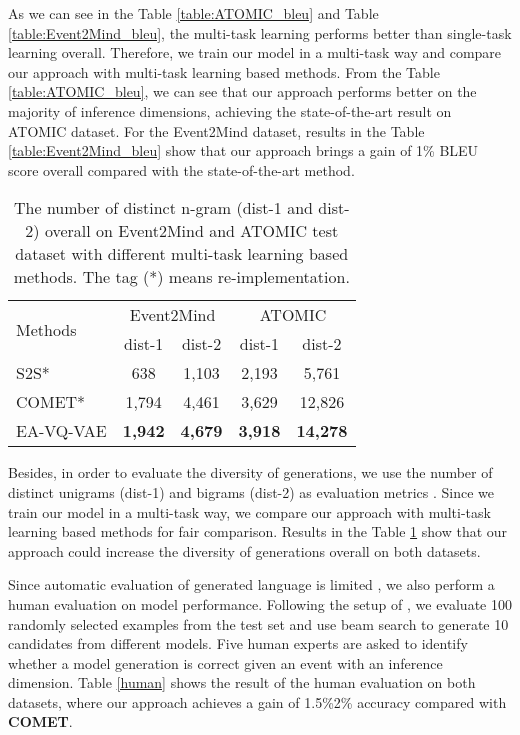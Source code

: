\documentclass[11pt,a4paper]{article}
\begin{document}
As we can see in the Table \ref{table:ATOMIC_bleu} and Table \ref{table:Event2Mind_bleu}, the multi-task learning performs better than single-task learning overall. Therefore, we train our model in a multi-task way and compare our approach with multi-task learning based methods. 
From the Table \ref{table:ATOMIC_bleu}, we can see that our approach \mbox{performs} better on the majority of inference dimensions, achieving the state-of-the-art result on ATOMIC dataset. For the Event2Mind dataset, results in the Table \ref{table:Event2Mind_bleu} show that our approach brings a gain of 1\% BLEU score overall compared with the state-of-the-art method.




 \begin{table}[h]\small
	\centering
	\begin{tabular}{l|c|c|c|c}
		\hline
		\multirow{2}{*}{Methods}& \multicolumn{2}{c|}{Event2Mind} & \multicolumn{2}{c}{ATOMIC} \\
		\cline{2-5}
		& dist-1 & dist-2 & dist-1 & dist-2 \\
		\hline
S2S* & 638 &  1,103  & 2,193&5,761 \\
		COMET* & 1,794 &  4,461  & 3,629 & 12,826 \\
		EA-VQ-VAE & \bf{1,942} &  \bf{4,679}  & \bf{3,918} & \bf{14,278} \\ 
		\hline
	\end{tabular}
	\caption{The number of distinct n-gram (dist-1 and dist-2) overall on Event2Mind and ATOMIC test dataset with different multi-task learning based methods. The tag (*) means re-implementation.}
	\label{table:diversity} 
	\vspace{-0.2cm}
\end{table}

Besides, in order to evaluate the diversity of generations, we use the number of distinct unigrams (dist-1) and bigrams (dist-2) as evaluation \mbox{metrics} \cite{li2015diversity}. Since we train our model in a multi-task way, we compare our approach with multi-task learning based methods for fair comparison. Results in the Table \ref{table:diversity} show that our approach could increase the diversity of generations overall on both datasets.


Since automatic evaluation of generated language is limited \cite{liu-etal-2016-evaluate}, we also perform a human evaluation on model performance. Following the setup of \cite{sap2019atomic}, we evaluate 100 randomly selected examples from the test set and use beam search to generate 10 candidates from different models. Five human experts are asked to identify whether a model generation is correct given an event with an inference dimension. Table \ref{human} shows the result of the human evaluation on both datasets, where our approach achieves a gain of 1.5\%2\% accuracy compared with {\bf COMET}.
\end{document}
